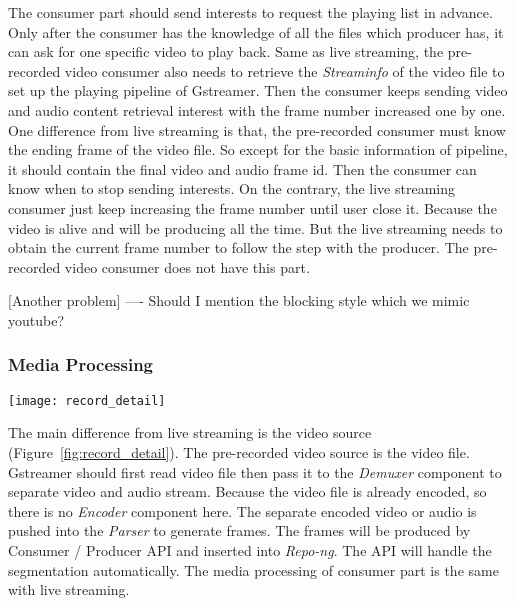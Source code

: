 The consumer part should send interests to request the playing list in advance. Only after the consumer has the knowledge of all the files which producer has, it can ask for one specific video to play back. Same as live streaming, the pre-recorded video consumer also needs to retrieve the \textit{Streaminfo} of the video file to set up the playing pipeline of Gstreamer. Then the consumer keeps sending video and audio content retrieval interest with the frame number increased one by one. One difference from live streaming is that, the pre-recorded consumer must know the ending frame of the video file. So except for the basic information of pipeline, it should contain the final video and audio frame id. Then the consumer can know when to stop sending interests. On the contrary, the live streaming consumer just keep increasing the frame number until user close it. Because the video is alive and will be producing all the time. But the live streaming needs to obtain the current frame number to follow the step with the producer. The pre-recorded video consumer does not have this part.

[Another problem] ---- Should I mention the blocking style which we mimic youtube?

\subsubsection{Media Processing}

\begin{figure*}%
  \centering
  \texttt{[image: record\_detail]}
  \caption{Pre-recorded Streaming Media Processing}
  \label{fig:record_detail}
\end{figure*}

The main difference from live streaming is the video source (Figure~\ref{fig:record_detail}). The pre-recorded video source is the video file. Gstreamer should first read video file then pass it to the \textit{Demuxer} component to separate video and audio stream. Because the video file is already encoded, so there is no \textit{Encoder} component here. The separate encoded video or audio is pushed into the \textit{Parser} to generate frames. The frames will be produced by Consumer / Producer API and inserted into \textit{Repo-ng}. The API will handle the segmentation automatically. The media processing of consumer part is the same with live streaming.

